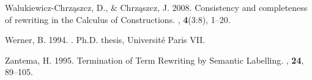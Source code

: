 \begin{thebibliography}{}
Walukiewicz-Chrz\k{a}szcz, D., \& Chrz\k{a}szcz, J. 2008.
\newblock Consistency and completeness of rewriting in the Calculus of
  Constructions.
, {\bf 4}(3:8), 1--20.

Werner, B. 1994.
.
\newblock Ph.D. thesis, Universit\'e Paris VII.

Zantema, H. 1995.
\newblock Termination of Term Rewriting by Semantic Labelling.
, {\bf 24}, 89--105.

\end{thebibliography}
